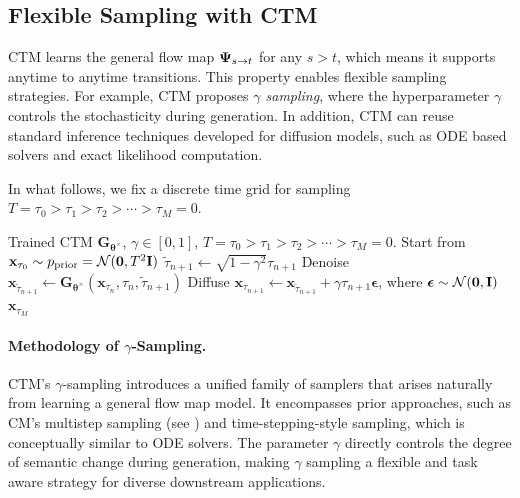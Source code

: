 \subsection{Flexible Sampling with CTM}
CTM learns the general flow map ${\bm{\Psi}}_{s\to t}$ for any $s>t$, which means it supports
anytime to anytime transitions. This property enables flexible sampling strategies. 
For example, CTM proposes \emph{$\gamma$ sampling}, where the hyperparameter $\gamma$
controls the stochasticity during generation.
In addition, CTM can reuse standard inference techniques developed for diffusion models,
such as ODE based solvers and exact likelihood computation.

In what follows, we fix a discrete time grid for sampling $T=\tau_0 > \tau_1 > \tau_2 > \cdots > \tau_{M}=0$.

\begin{algorithm}[H]
    \centering
    \caption{CTM's $\gamma$-sampling}\label{alg:gamma}
    \begin{algorithmic}[1]
    \Require Trained CTM $\mathbf{G}_{\bm{\theta}^\times}$, $\gamma\in[0,1]$, $T=\tau_0>\tau_1 > \tau_2 > \cdots > \tau_{M}=0$.
    \State Start from $\mathbf{x}_{\tau_{0}}\sim p_{\mathrm{prior}}=\mathcal{N}(\bm{0}, T^2{\mathbf{I}})$
        \State $\tilde{\tau}_{n+1}\leftarrow \sqrt{1-\gamma^{2}}\tau_{n+1}$
        \State Denoise $\mathbf{x}_{\tilde{\tau}_{n+1}}\leftarrow \mathbf{G}_{\bm{\theta}^\times}(\mathbf{x}_{\tau_{n}},\tau_{n},\tilde{\tau}_{n+1})$
        \State Diffuse $\mathbf{x}_{\tau_{n+1}}\leftarrow\mathbf{x}_{\tilde{\tau}_{n+1}}+\gamma \tau_{n+1}\bm{\epsilon}$, where $\bm{\epsilon}\sim\mathcal{N}(\bm{0}, {\mathbf{I}})$
        \EndFor
        \Ensure  $\mathbf{x}_{\tau_{M}}$
    \end{algorithmic}
\end{algorithm}

\paragraph{Methodology of $\gamma$-Sampling.}
CTM's $\gamma$-sampling introduces a unified family of samplers that arises naturally from learning a general flow map model.  
It encompasses prior approaches, such as CM's multistep sampling (see ) 
and time-stepping-style sampling, which is conceptually similar to ODE solvers.  
The parameter $\gamma$ directly controls the degree of semantic change during generation, 
making $\gamma$ sampling a flexible and task aware strategy for diverse downstream applications.





